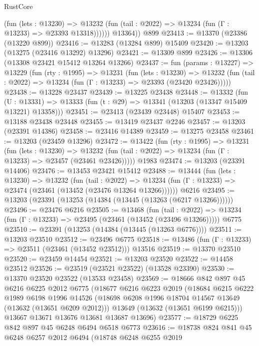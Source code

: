 \begin{lexlean}{RustCore}
\begin{coremodule}
              (fun (lets : @13230) =>
              @13232 (fun (tail : @2022) => @13234 (fun (Γ : @13233) => @23393 @13318))))))
        @13364))
    @899
@23413 := @13370 (@23386 (@13220 @899))
@23416 := @13283 (@13284 @899) @15409
@23420 := @13203 (@13275 (@23416 @13292) @13296)
@23421 := @13309 @899
@23426 := @13306 (@13308 @23421 @15412 @13264 @13266)
@23437 := fun (params : @13227) =>
  @13229
    (fun (rty : @1995) =>
    @13231
      (fun (lets : @13230) =>
      @13232 (fun (tail : @2022) => @13234 (fun (Γ : @13233) => @23393 (@23420 @23426)))))
@23438 := @13228 @23437
@23439 := @13225 @23438
@23448 := @13332
    (fun (U : @13331) => @13333 (fun (t : @29) => @13341 (@13203 (@13347 @15409 @13221) @13358)))
@23451 := @23413 (@23439 @23448) @15407
@23453 := @13188 @23438 @23448
@23455 := @13419 @23437 @2246
@23457 := @13203 (@23391 @14386)
@23458 := @23416 @14389
@23459 := @13275 @23458
@23461 := @13203 (@23459 @13296)
@23472 := @13422
    (fun (rty : @1995) =>
    @13231
      (fun (lets : @13230) =>
      @13232 (fun (tail : @2022) => @13234 (fun (Γ : @13233) => @23457 (@23461 @23426)))))
    @1983
@23474 := @13203 (@23391 @14406)
@23476 := @13453 @23421 @15412
@23488 := @13444
    (fun (lets : @13230) =>
    @13232
      (fun (tail : @2022) =>
      @13234 (fun (Γ : @13233) => @23474 (@23461 (@13452 (@23476 @13264 @13266))))))
    @6216
@23495 := @13203 (@23391 (@13253 (@14384 (@13445 (@13263 (@6217 @13266))))))
@23496 := @23476 @6216
@23505 := @13468
    (fun (tail : @2022) => @13234 (fun (Γ : @13233) => @23495 (@23461 (@13452 (@23496 @13266)))))
    @6775
@23510 := @23391 (@13253 (@14384 (@13445 (@13263 @6776))))
@23511 := @13203 @23510
@23512 := @23496 @6775
@23518 := @13486 (fun (Γ : @13233) => @23511 (@23461 (@13452 @23512))) @13516
@23519 := @13370 @23510
@23520 := @23459 @14454
@23521 := @13203 @23520
@23522 := @14458 @23512
@23526 := @23519 (@23521 @23522) (@13528 @23390)
@23530 := @13370 @23520 @23522 (@13533 @23458)
@23569 := @18666
    @842
    @897
    @45
    @6216
    @6225
    @2012
    @6775
    (@18677
      @6216
      @6223
      @2019
      (@18684
        @6215
        @6222
        @1989
        @6198
        @1996
        @14526
        (@18698 @6208 @1996 @18704 @14567 @13649 (@13632 (@13651 @6209 @2012)))
        @13649
        (@13632 (@13651 @6199 @6215)))
      @13667
      @13671
      @13676
      @13681
      @13687
      @13696)
@23577 := @18729 @6225 @842 @897 @45 @6248 @6494 @6518 @6773
@23616 := @18738
    @824
    @841
    @45
    @6248
    @6257
    @2012
    @6494
    (@18748
      @6248
      @6255
      @2019

\end{coremodule}
\end{lexlean}
